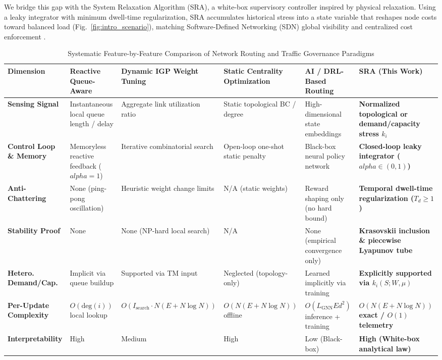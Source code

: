 \documentclass{ccjnl}
\newcommand{\rev}[1]{#1}
\def\rev#1{#1}%
\def\widetilde#1{#1}%
\def\kappa{k}%
\def\alpha{alpha}%
\begin{document}
We bridge this gap with the System Relaxation Algorithm (SRA), a white-box supervisory controller inspired by physical relaxation. Using a leaky integrator \rev{with minimum dwell-time regularization}, SRA accumulates historical stress into a state variable that reshapes node costs toward balanced load (Fig.~\ref{fig:intro_scenario}), matching Software-Defined Networking (SDN) global visibility and centralized cost enforcement \cite{hou2020reliable}.

\begin{table}[t]
\centering
\scriptsize\setlength{\tabcolsep}{3.5pt}\renewcommand{\arraystretch}{1.05}
\caption{\rev{Systematic Feature-by-Feature Comparison of Network Routing and Traffic Governance Paradigms}}
\label{tab:related_work_comparison}
\begin{tabularx}{\textwidth}{@{}l*{5}{>{\raggedright\arraybackslash}X}@{}}
\toprule
\textbf{Dimension} & \textbf{Reactive Queue-Aware \cite{Macabale2020Cradle,SM2025Novel}} & \textbf{Dynamic IGP Weight Tuning \cite{Fortz2000OSPF}} & \textbf{Static Centrality Optimization \cite{Upadhyay2024OpticalBC,DeMedeiros2017QuasiShortest}} & \textbf{AI / DRL-Based Routing \cite{Wei2023GRLPS,Feng2025MultiAgentGNN}} & \textbf{SRA (This Work)} \\
\midrule
\textbf{Sensing Signal} & Instantaneous local queue length / delay & Aggregate link utilization ratio & Static topological BC / degree & High-dimensional state embeddings & \rev{\textbf{Normalized topological or demand/capacity stress $\widetilde{\kappa}_i$}} \\
\textbf{Control Loop \& Memory} & Memoryless reactive feedback ($\alpha=1$) & Iterative combinatorial search & Open-loop one-shot static penalty & Black-box neural policy network & \rev{\textbf{Closed-loop leaky integrator ($\alpha \in (0,1)$)}} \\
\textbf{Anti-Chattering} & None (ping-pong oscillation) & Heuristic weight change limits & N/A (static weights) & Reward shaping only (no hard bound) & \rev{\textbf{Temporal dwell-time regularization ($T_d \ge 1$)}} \\
\textbf{Stability Proof} & None & None (NP-hard local search) & N/A & None (empirical convergence only) & \rev{\textbf{Krasovskii inclusion \& piecewise Lyapunov tube}} \\
\textbf{Hetero. Demand/Cap.} & Implicit via queue buildup & Supported via TM input & Neglected (topology-only) & Learned implicitly via training & \rev{\textbf{Explicitly supported via $\widetilde{\kappa}_i(S;W,\mu)$}} \\
\textbf{Per-Update Complexity} & $O(\text{deg}(i))$ local lookup & $O(I_{\text{search}}\cdot N(E+N\log N))$ & $O(N(E+N\log N))$ offline & $O(L_{\text{GNN}} E d^2)$ inference + training & \rev{\textbf{$O(N(E+N\log N))$ exact / $O(1)$ telemetry}} \\
\textbf{Interpretability} & High & Medium & High & Low (Black-box) & \textbf{High (White-box analytical law)} \\
\bottomrule
\end{tabularx}
\end{table}
\end{document}
